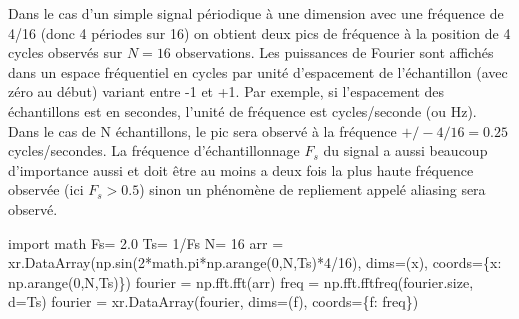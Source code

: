 \documentclass[
  11pt,
  letterpaper,
  open=any,
  twoside=false,
  french]{scrbook}
\newenvironment{Shaded}{\begin{snugshade}}{\end{snugshade}}
\newcommand{\DecValTok}[1]{\textcolor[rgb]{0.68,0.00,0.00}{#1}}
\newcommand{\FloatTok}[1]{\textcolor[rgb]{0.68,0.00,0.00}{#1}}
\newcommand{\ImportTok}[1]{\textcolor[rgb]{0.00,0.46,0.62}{#1}}
\newcommand{\NormalTok}[1]{\textcolor[rgb]{0.00,0.23,0.31}{#1}}
\newcommand{\OperatorTok}[1]{\textcolor[rgb]{0.37,0.37,0.37}{#1}}
\newcommand{\StringTok}[1]{\textcolor[rgb]{0.13,0.47,0.30}{#1}}
\begin{document}
Dans le cas d'un simple signal périodique à une dimension avec une
fréquence de 4/16 (donc 4 périodes sur 16) on obtient deux pics de
fréquence à la position de 4 cycles observés sur \(N=16\) observations.
Les puissances de Fourier sont affichés dans un espace fréquentiel en
cycles par unité d'espacement de l'échantillon (avec zéro au début)
variant entre -1 et +1. Par exemple, si l'espacement des échantillons
est en secondes, l'unité de fréquence est cycles/seconde (ou Hz). Dans
le cas de N échantillons, le pic sera observé à la fréquence
\(+/- 4/16=0.25\) cycles/secondes. La fréquence d'échantillonnage
\(F_s\) du signal a aussi beaucoup d'importance aussi et doit être au
moins a deux fois la plus haute fréquence observée (ici \(F_s > 0.5\))
sinon un phénomène de repliement appelé aliasing sera observé.

\begin{Shaded}
\begin{Highlighting}[]
\ImportTok{import}\NormalTok{ math}
\NormalTok{Fs}\OperatorTok{=} \FloatTok{2.0}
\NormalTok{Ts}\OperatorTok{=} \DecValTok{1}\OperatorTok{/}\NormalTok{Fs}
\NormalTok{N}\OperatorTok{=} \DecValTok{16}
\NormalTok{arr }\OperatorTok{=}\NormalTok{ xr.DataArray(np.sin(}\DecValTok{2}\OperatorTok{*}\NormalTok{math.pi}\OperatorTok{*}\NormalTok{np.arange(}\DecValTok{0}\NormalTok{,N,Ts)}\OperatorTok{*}\DecValTok{4}\OperatorTok{/}\DecValTok{16}\NormalTok{),}
\NormalTok{                   dims}\OperatorTok{=}\NormalTok{(}\StringTok{\textquotesingle{}x\textquotesingle{}}\NormalTok{), coords}\OperatorTok{=}\NormalTok{\{}\StringTok{\textquotesingle{}x\textquotesingle{}}\NormalTok{: np.arange(}\DecValTok{0}\NormalTok{,N,Ts)\})}
\NormalTok{fourier }\OperatorTok{=}\NormalTok{ np.fft.fft(arr)}
\NormalTok{freq }\OperatorTok{=}\NormalTok{ np.fft.fftfreq(fourier.size, d}\OperatorTok{=}\NormalTok{Ts)}
\NormalTok{fourier }\OperatorTok{=}\NormalTok{ xr.DataArray(fourier,}
\NormalTok{                   dims}\OperatorTok{=}\NormalTok{(}\StringTok{\textquotesingle{}f\textquotesingle{}}\NormalTok{), coords}\OperatorTok{=}\NormalTok{\{}\StringTok{\textquotesingle{}f\textquotesingle{}}\NormalTok{: freq\})}


\end{Highlighting}
\end{Shaded}
\end{document}
